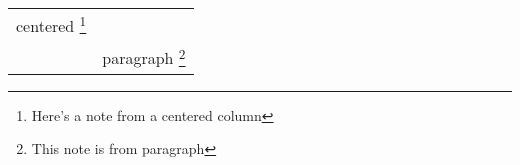 \documentclass{article}
\begin{document}
\begin{longtable}{
    c
    >{\raggedright}p{3cm}
  }
  centered \footnote{Here's a note from a
    centered column} \tabularnewline
  & paragraph \footnote{This note is from paragraph } \tabularnewline
\end{longtable}
\end{document}
